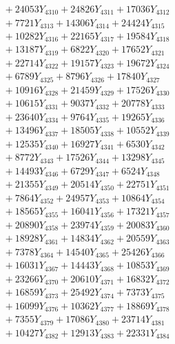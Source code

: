 \documentclass[a4paper,10pt]{article}
\begin{document}
{\begin{align}
&\;  + 24053 Y_{4310} + 24826 Y_{4311} + 17036 Y_{4312} \\[0.3ex]
&\;  + 7721 Y_{4313} + 14306 Y_{4314} + 24424 Y_{4315} \\[0.3ex]
&\;  + 10282 Y_{4316} + 22165 Y_{4317} + 19584 Y_{4318} \\[0.5ex]\allowbreak
&\;  + 13187 Y_{4319} + 6822 Y_{4320} + 17652 Y_{4321} \\[0.3ex]
&\;  + 22714 Y_{4322} + 19157 Y_{4323} + 19672 Y_{4324} \\[0.3ex]
&\;  + 6789 Y_{4325} + 8796 Y_{4326} + 17840 Y_{4327} \\[0.3ex]
&\;  + 10916 Y_{4328} + 21459 Y_{4329} + 17526 Y_{4330} \\[0.3ex]
&\;  + 10615 Y_{4331} + 9037 Y_{4332} + 20778 Y_{4333} \\[0.3ex]
&\;  + 23640 Y_{4334} + 9764 Y_{4335} + 19265 Y_{4336} \\[0.3ex]
&\;  + 13496 Y_{4337} + 18505 Y_{4338} + 10552 Y_{4339} \\[0.3ex]
&\;  + 12535 Y_{4340} + 16927 Y_{4341} + 6530 Y_{4342} \\[0.3ex]
&\;  + 8772 Y_{4343} + 17526 Y_{4344} + 13298 Y_{4345} \\[0.3ex]
&\;  + 14493 Y_{4346} + 6729 Y_{4347} + 6524 Y_{4348} \\[0.5ex]\allowbreak
&\;  + 21355 Y_{4349} + 20514 Y_{4350} + 22751 Y_{4351} \\[0.3ex]
&\;  + 7864 Y_{4352} + 24957 Y_{4353} + 10864 Y_{4354} \\[0.3ex]
&\;  + 18565 Y_{4355} + 16041 Y_{4356} + 17321 Y_{4357} \\[0.3ex]
&\;  + 20890 Y_{4358} + 23974 Y_{4359} + 20083 Y_{4360} \\[0.3ex]
&\;  + 18928 Y_{4361} + 14834 Y_{4362} + 20559 Y_{4363} \\[0.3ex]
&\;  + 7378 Y_{4364} + 14540 Y_{4365} + 25426 Y_{4366} \\[0.3ex]
&\;  + 16031 Y_{4367} + 14443 Y_{4368} + 10853 Y_{4369} \\[0.3ex]
&\;  + 23266 Y_{4370} + 20610 Y_{4371} + 16832 Y_{4372} \\[0.3ex]
&\;  + 16859 Y_{4373} + 25492 Y_{4374} + 7373 Y_{4375} \\[0.3ex]
&\;  + 16099 Y_{4376} + 10362 Y_{4377} + 18869 Y_{4378} \\[0.5ex]\allowbreak
&\;  + 7355 Y_{4379} + 17086 Y_{4380} + 23714 Y_{4381} \\[0.3ex]
&\;  + 10427 Y_{4382} + 12913 Y_{4383} + 22331 Y_{4384} \\[0.3ex]

\end{align}}
\end{document}
